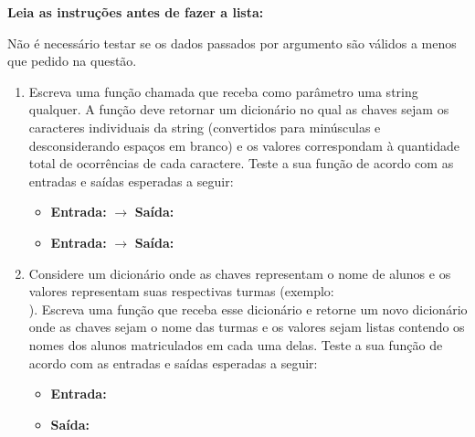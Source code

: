 
\vspace{1cm}

\noindent  \textbf{Leia as instruções antes de fazer a lista:}

\vspace{0.3cm}
\noindent  Não é necessário testar se os dados passados por argumento são válidos a menos que pedido na questão.


\vspace{0.5cm}


\begin{enumerate}[label=\textbf{Q\arabic*.}]

\item Escreva uma função chamada  que receba como parâmetro uma string qualquer. A função deve retornar um dicionário no qual as chaves sejam os caracteres individuais da string (convertidos para minúsculas e desconsiderando espaços em branco) e os valores correspondam à quantidade total de ocorrências de cada caractere. Teste a sua função de acordo com as entradas e saídas esperadas a seguir:

\begin{itemize}
    \item \textbf{Entrada:}  $\rightarrow$ \textbf{Saída:} 
    \item \textbf{Entrada:}  $\rightarrow$ \textbf{Saída:} \\
\end{itemize}





\item Considere um dicionário onde as chaves representam o nome de alunos e os valores representam suas respectivas turmas (exemplo: \\). Escreva uma função  que receba esse dicionário e retorne um novo dicionário onde as chaves sejam o nome das turmas e os valores sejam listas contendo os nomes dos alunos matriculados em cada uma delas. Teste a sua função de acordo com as entradas e saídas esperadas a seguir:

\begin{itemize}
    \item \textbf{Entrada:} \\
    \item \textbf{Saída:} 
\end{itemize}



\end{enumerate}
